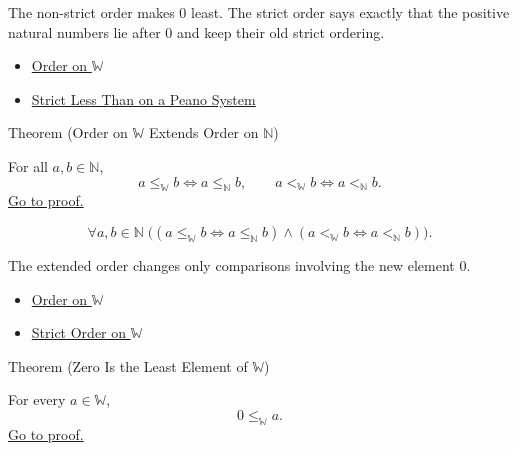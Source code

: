 \begin{remark*}[Interpretation]
The non-strict order makes $0$ least. The strict order says exactly that the
positive natural numbers lie after $0$ and keep their old strict ordering.
\end{remark*}

\begin{dependencies}
\begin{itemize}
  \item \hyperref[def:order-on-w]{Order on $\mathbb{W}$}
  \item \hyperref[def:strict-less-than-on-peano-system]{Strict Less Than on a Peano System}
\end{itemize}
\end{dependencies}

\begin{theorembox}{Theorem (Order on \texorpdfstring{$\mathbb{W}$}{W} Extends Order on \texorpdfstring{$\mathbb{N}$}{N})}
\begin{theorem}
\label{thm:order-on-w-extends-order-on-n}
For all $a,b\in\mathbb{N}$,
\[
a\leq_{\mathbb{W}}b\Longleftrightarrow a\leq_{\mathbb{N}}b,
\qquad
a<_{\mathbb{W}}b\Longleftrightarrow a<_{\mathbb{N}}b.
\]
\hyperref[prf:order-on-w-extends-order-on-n]{Go to proof.}
\end{theorem}
\end{theorembox}

\begin{remark*}
\[
\forall a,b\in\mathbb{N}\;
\bigl(
(a\leq_{\mathbb{W}}b\Longleftrightarrow a\leq_{\mathbb{N}}b)
\wedge
(a<_{\mathbb{W}}b\Longleftrightarrow a<_{\mathbb{N}}b)
\bigr).
\]
\end{remark*}

\begin{remark*}[Interpretation]
The extended order changes only comparisons involving the new element $0$.
\end{remark*}

\begin{dependencies}
\begin{itemize}
  \item \hyperref[def:order-on-w]{Order on $\mathbb{W}$}
  \item \hyperref[def:strict-order-on-w]{Strict Order on $\mathbb{W}$}
\end{itemize}
\end{dependencies}

\begin{theorembox}{Theorem (Zero Is the Least Element of \texorpdfstring{$\mathbb{W}$}{W})}
\begin{theorem}
\label{thm:zero-least-element-of-w}
For every $a\in\mathbb{W}$,
\[
0\leq_{\mathbb{W}}a.
\]
\hyperref[prf:zero-least-element-of-w]{Go to proof.}
\end{theorem}
\end{theorembox}

